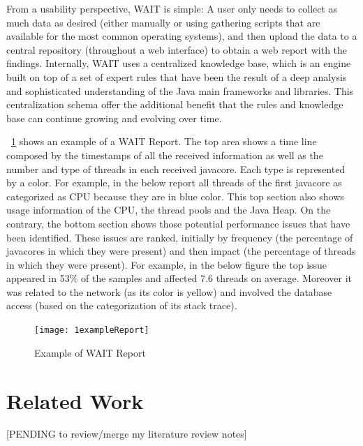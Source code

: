 \documentclass[runningheads,a4paper]{llncs}
\begin{document}
From a usability perspective, WAIT is simple: A user only needs to
collect as much data as desired (either manually or using gathering scripts
that are available for the most common operating systems), and then upload the
data to a central repository (throughout a web interface) to obtain a web 
report with the findings. Internally, WAIT uses a centralized knowledge base,
which is an engine built on top of a set of expert rules that have been the result of a 
deep analysis and sophisticated understanding of the Java main frameworks and
libraries. This centralization schema offer the additional benefit that
the rules and knowledge base can continue growing and evolving over time.

\figurename ~\ref{fig_WAITReport} shows an example of a WAIT Report. The top
area shows a time line composed by the timestamps of all the received
information as well as the number and type of threads in each received javacore.
Each type is represented by a color. For example, in the below report all
threads of the first javacore as categorized as CPU because they are in blue
color. This top section also shows usage information of the CPU, the thread
pools and the Java Heap. On the contrary, the bottom section shows those potential
performance issues that have been identified. These issues are ranked, initially
by frequency (the percentage of javacores in which they were present) and then
impact (the percentage of threads in which they were present). For example, in
the below figure the top issue appeared in 53\% of the samples and affected 7.6 threads on average.
Moreover it was related to the network (as its color is yellow) and involved the
database access (based on the categorization of its stack trace).

\begin{figure}[!h]
\texttt{[image: 1exampleReport]}
\caption{Example of WAIT Report}
\label{fig_WAITReport}
\end{figure}


\section{Related Work}

[PENDING to review/merge my literature review notes]
\end{document}
